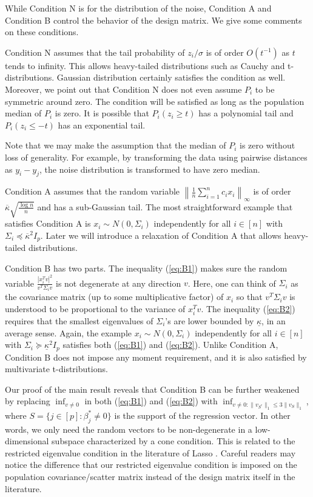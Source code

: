 While Condition N is for the distribution of the noise, Condition A and Condition B control the behavior of the design matrix. We give some comments on these conditions.

Condition N assumes that the tail probability of $z_i/\sigma$ is of order $O(t^{-1})$ as $t$ tends to infinity. This allows heavy-tailed distributions such as Cauchy and t-distributions. Gaussian distribution certainly satisfies the condition as well. Moreover, we point out that Condition N does not even assume $P_i$ to be symmetric around zero. The condition will be satisfied as long as the population median of $P_i$ is zero. It is possible that $P_i(z_i\geq t)$ has a polynomial tail and $P_i(z_i\leq -t)$ has an exponential tail.

Note that we may make the assumption that the median of $P_i$ is zero without loss
of generality. For example, by transforming the data using pairwise
distances as $y_i - y_j$, the noise distribution is transformed to have
zero median.

Condition A assumes that the random variable $\left\|\frac{1}{n}\sum_{i=1}^nc_ix_i\right\|_{\infty}$ is of order $\overline{\kappa}\sqrt{\frac{\log n}{n}}$ and has a sub-Gaussian tail. The most straightforward example that satisfies Condition A is $x_i\sim N(0,\Sigma_i)$ independently for all $i\in[n]$ with $\Sigma_i\preceq \overline{\kappa}^2I_p$. Later we will introduce a relaxation of Condition A that allows heavy-tailed distributions.

Condition B has two parts. The inequality (\ref{eq:B1}) makes sure the random variable $\frac{|x_i^Tv|^2}{v^T\Sigma_i v}$ is not degenerate at any direction $v$. Here, one can think of $\Sigma_i$ as the covariance matrix (up to some multiplicative factor) of $x_i$ so that $v^T\Sigma_iv$ is understood to be proportional to the variance of $x_i^Tv$. The inequality (\ref{eq:B2}) requires that the smallest eigenvalues of $\Sigma_i$'s are lower bounded by $\underline{\kappa}$, in an average sense. Again, the example $x_i\sim N(0,\Sigma_i)$ independently for all $i\in[n]$ with $\Sigma_i\succeq \underline{\kappa}^2I_p$ satisfies both (\ref{eq:B1}) and (\ref{eq:B2}). Unlike Condition A, Condition B does not impose any moment requirement, and it is also satisfied by multivariate t-distributions.

Our proof of the main result reveals that Condition B can be further weakened by replacing $\inf_{v\neq 0}$ in both (\ref{eq:B1}) and (\ref{eq:B2}) with $\inf_{v\neq 0: \|v_{S^c}\|_1\leq 3\|v_S\|_1}$, where $S=\{j\in[p]:\beta_j^*\neq 0\}$ is the support of the regression vector. In other words, we only need the random vectors to be non-degenerate in a low-dimensional subspace characterized by a cone condition. This is related to the restricted eigenvalue condition in the literature of Lasso \citep{bickel2009simultaneous}. Careful readers may notice the difference that our restricted eigenvalue condition is imposed on the population covariance/scatter matrix instead of the design matrix itself in the literature.

